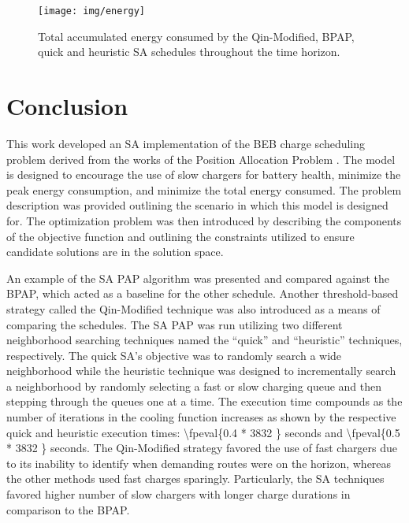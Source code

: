 \documentclass[energies,article,submit,moreauthors]{Definitions/mdpi}
\newcommand{\tempcnt}{3832 }                                                    %
\newcommand{\quicklocal}{0.4 }                                                  %
\newcommand{\heuristiclocal}{0.5 }                                              %
\begin{document}
\begin{figure}[htpb]
\centering \texttt{[image: img/energy]}
    \caption{Total accumulated energy consumed by the Qin-Modified, BPAP, quick and heuristic SA schedules throughout the time horizon.}
    \label{fig:energy-usage}
\end{figure}

\section{Conclusion}
\label{sec:sa-conclusion}
This work developed an SA implementation of the BEB charge scheduling problem derived from the works of the Position
Allocation Problem \cite{qarebagh-2019-optim-sched}. The model is designed to encourage the use of slow chargers for
battery health, minimize the peak energy consumption, and minimize the total energy consumed. The problem description
was provided outlining the scenario in which this model is designed for. The optimization problem was then introduced by
describing the components of the objective function and outlining the constraints utilized to ensure candidate solutions
are in the solution space.

An example of the SA PAP algorithm was presented and compared against the BPAP, which acted as a baseline for the other
schedule. Another threshold-based strategy called the Qin-Modified technique was also introduced as a means of comparing
the schedules. The SA PAP was run utilizing two different neighborhood searching techniques named the ``quick'' and
``heuristic'' techniques, respectively. The quick SA's objective was to randomly search a wide neighborhood while the
heuristic technique was designed to incrementally search a neighborhood by randomly selecting a fast or slow charging
queue and then stepping through the queues one at a time. The execution time compounds as the number of iterations in
the cooling function increases as shown by the respective quick and heuristic execution times:
\num{\fpeval{\quicklocal * \tempcnt}} seconds and \num{\fpeval{\heuristiclocal * \tempcnt}}
seconds. The Qin-Modified strategy favored the use of fast chargers due to its inability to identify when demanding
routes were on the horizon, whereas the other methods used fast charges sparingly. Particularly, the SA techniques
favored higher number of slow chargers with longer charge durations in comparison to the BPAP.
\end{document}
